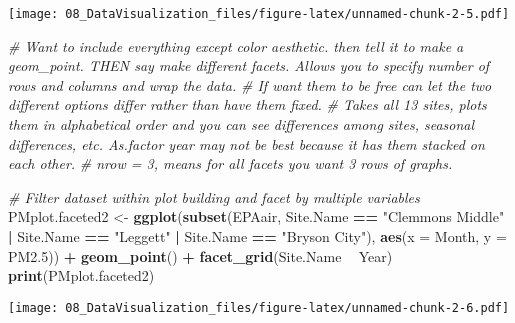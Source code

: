 \documentclass[]{article}
\newenvironment{Shaded}{\begin{snugshade}}{\end{snugshade}}
\newcommand{\KeywordTok}[1]{\textcolor[rgb]{0.13,0.29,0.53}{\textbf{#1}}}
\newcommand{\DataTypeTok}[1]{\textcolor[rgb]{0.13,0.29,0.53}{#1}}
\newcommand{\DecValTok}[1]{\textcolor[rgb]{0.00,0.00,0.81}{#1}}
\newcommand{\StringTok}[1]{\textcolor[rgb]{0.31,0.60,0.02}{#1}}
\newcommand{\CommentTok}[1]{\textcolor[rgb]{0.56,0.35,0.01}{\textit{#1}}}
\newcommand{\OperatorTok}[1]{\textcolor[rgb]{0.81,0.36,0.00}{\textbf{#1}}}
\newcommand{\NormalTok}[1]{#1}
\begin{document}
\texttt{[image: 08\_DataVisualization\_files/figure-latex/unnamed-chunk-2-5.pdf]}

\begin{Shaded}
\begin{Highlighting}[]
\CommentTok{# Want to include everything except color aesthetic. then tell it to make a geom_point. THEN say make different facets. Allows you to specify number of rows and columns and wrap the data.}
\CommentTok{# If want them to be free can let the two different options differ rather than have them fixed. }
\CommentTok{# Takes all 13 sites, plots them in alphabetical order and you can see differences among sites, seasonal differences, etc. As.factor year may not be best because it has them stacked on each other.}
\CommentTok{# nrow = 3, means for all facets you want 3 rows of graphs.}

\CommentTok{# Filter dataset within plot building and facet by multiple variables}
\NormalTok{PMplot.faceted2 <-}\StringTok{ }
\StringTok{  }\KeywordTok{ggplot}\NormalTok{(}\KeywordTok{subset}\NormalTok{(EPAair, Site.Name }\OperatorTok{==}\StringTok{ "Clemmons Middle"} \OperatorTok{|}\StringTok{ }\NormalTok{Site.Name }\OperatorTok{==}\StringTok{ "Leggett"} \OperatorTok{|}
\StringTok{                  }\NormalTok{Site.Name }\OperatorTok{==}\StringTok{ "Bryson City"}\NormalTok{), }
         \KeywordTok{aes}\NormalTok{(}\DataTypeTok{x =}\NormalTok{ Month, }\DataTypeTok{y =}\NormalTok{ PM2.}\DecValTok{5}\NormalTok{)) }\OperatorTok{+}\StringTok{ }
\StringTok{  }\KeywordTok{geom_point}\NormalTok{() }\OperatorTok{+}
\StringTok{  }\KeywordTok{facet_grid}\NormalTok{(Site.Name }\OperatorTok{~}\StringTok{ }\NormalTok{Year) }
\KeywordTok{print}\NormalTok{(PMplot.faceted2)}
\end{Highlighting}
\end{Shaded}

\texttt{[image: 08\_DataVisualization\_files/figure-latex/unnamed-chunk-2-6.pdf]}

\begin{Shaded}
\end{Shaded}
\end{document}
